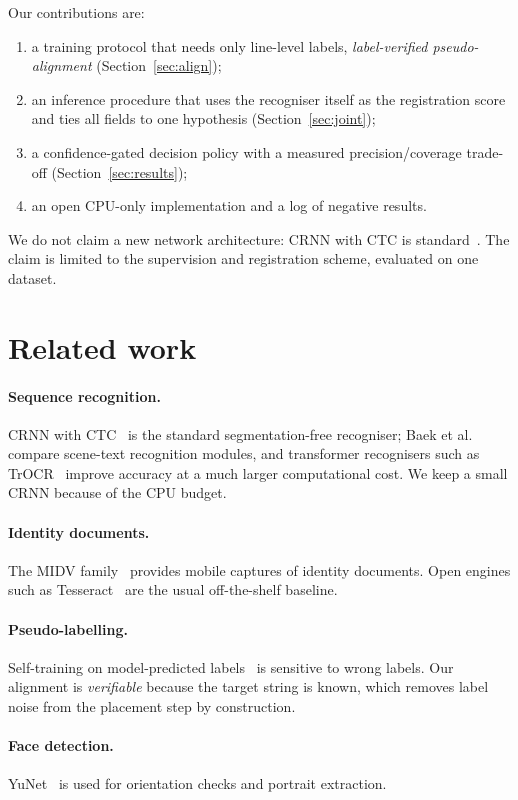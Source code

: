 \documentclass[11pt,a4paper]{article}
\begin{document}
Our contributions are:
\begin{enumerate}
  \item a training protocol that needs only line-level labels, \emph{label-verified pseudo-alignment} (Section~\ref{sec:align});
  \item an inference procedure that uses the recogniser itself as the registration score and ties all fields to one hypothesis (Section~\ref{sec:joint});
  \item a confidence-gated decision policy with a measured precision/coverage trade-off (Section~\ref{sec:results});
  \item an open CPU-only implementation and a log of negative results.
\end{enumerate}
We do not claim a new network architecture: CRNN with CTC is standard~\cite{shi2017crnn,graves2006ctc}. The claim is limited to the supervision and registration scheme, evaluated on one dataset.

\section{Related work}
\paragraph{Sequence recognition.} CRNN with CTC~\cite{shi2017crnn,graves2006ctc} is the standard segmentation-free recogniser; Baek et al.~\cite{baek2019wrong} compare scene-text recognition modules, and transformer recognisers such as TrOCR~\cite{li2023trocr} improve accuracy at a much larger computational cost. We keep a small CRNN because of the CPU budget.
\paragraph{Identity documents.} The MIDV family~\cite{arlazarov2019midv500,bulatov2022midv2020} provides mobile captures of identity documents. Open engines such as Tesseract~\cite{smith2007tesseract} are the usual off-the-shelf baseline.
\paragraph{Pseudo-labelling.} Self-training on model-predicted labels~\cite{lee2013pseudo} is sensitive to wrong labels. Our alignment is \emph{verifiable} because the target string is known, which removes label noise from the placement step by construction.
\paragraph{Face detection.} YuNet~\cite{wu2023yunet} is used for orientation checks and portrait extraction.
\end{document}
